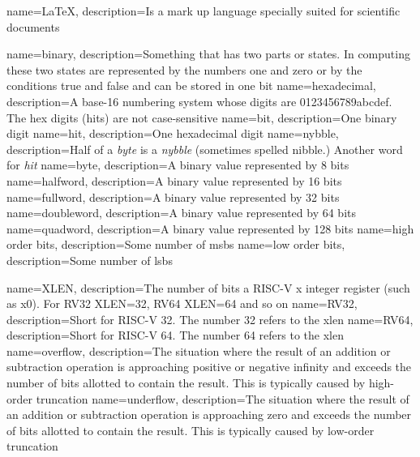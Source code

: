 {
    name=LaTeX,
    description={Is a mark up language specially suited
    	for scientific documents}
}

{
	name=binary,
	description={Something that has two parts or states.  In computing
		these two states are represented by the numbers one and zero or
		by the conditions true and false and can be stored in one \gls{bit}}
}
{
	name=hexadecimal,
	description={A base-16 numbering system whose digits are 0123456789abcdef.  
		The hex digits (\gls{hit}s) are not case-sensitive}
}
{
	name=bit,
	description={One binary digit}
}
{
	name={hit},
	description={One \gls{hexadecimal} digit}
}
{
	name={nybble},
	description={Half of a {\em \gls{byte}} is a {\em nybble}
		(sometimes spelled nibble.)  Another word for {\em \gls{hit}}}
}
{
	name=byte,
	description={A \gls{binary} value represented by 8 \gls{bit}s}
}
{
	name={halfword},
	description={A \gls{binary} value represented by 16 \gls{bit}s}
}
{
	name={fullword},
	description={A \gls{binary} value represented by 32 \gls{bit}s}
}
{
	name={doubleword},
	description={A \gls{binary} value represented by 64 \gls{bit}s}
}
{
	name={quadword},
	description={A \gls{binary} value represented by 128 \gls{bit}s}
}
{
	name={high order bits},
	description={Some number of \acrshort{msb}s}
}
{
    name={low order bits},
    description={Some number of \acrshort{lsb}s}
}

{
	name=XLEN,
	description={The number of bits a RISC-V x integer \gls{register}
		(such as x0).  For RV32 XLEN=32, RV64 XLEN=64 and so on}
}
{
	name=RV32,
	description={Short for RISC-V 32.  The number 32 refers to the \gls{xlen}}
}
{
	name=RV64,
	description={Short for RISC-V 64.  The number 64 refers to the \gls{xlen}}
}
{
	name=overflow,
	description={The situation where the result of an addition or 
		subtraction operation is approaching positive or negative 
		infinity and exceeds the number of bits allotted to contain 
		the result.  This is typically caused by high-order truncation}
}
{
	name=underflow,
	description={The situation where the result of an addition or 
		subtraction operation is approaching zero and exceeds the number 
		of bits allotted to contain the result.  This is typically
        caused by low-order truncation}
}

